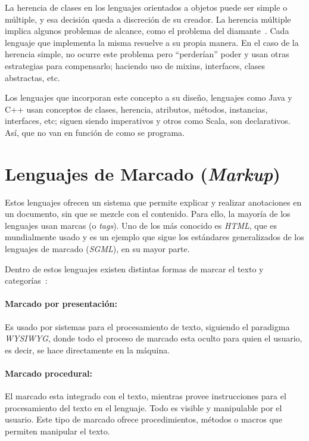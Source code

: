 \documentclass[12pt,letterpaper,titlepage,oneside,openright]{book}
\begin{document}
La herencia de clases en los lenguajes orientados a objetos puede ser simple o múltiple, y esa decisión queda a discreción de su creador. La herencia múltiple implica algunos problemas de alcance, como el problema del diamante~\cite{cargill1993case}. Cada lenguaje que implementa la misma resuelve a su propia manera. En el caso de la herencia simple, no ocurre este problema pero ``perderían'' poder y usan otras estrategias para compensarlo; haciendo uso de mixins, interfaces, clases abstractas, etc.

Los lenguajes que incorporan este concepto a su diseño, lenguajes como Java y C++ usan conceptos de clases, herencia, atributos, métodos, instancias, interfaces, etc; siguen siendo imperativos y otros como Scala, son declarativos. Así, que no van en función de como se programa.

\section{Lenguajes de Marcado (\textit{Markup})}

Estos lenguajes ofrecen un sistema que permite explicar y realizar anotaciones en un documento, sin que se mezcle con el contenido. Para ello, la mayoría de los lenguajes usan marcas (o \textit{tags}). Uno de los más conocido es \textit{HTML}, que es mundialmente usado y es un ejemplo que sigue los estándares generalizados de los lenguajes de marcado (\textit{SGML}), en su mayor parte.

Dentro de estos lenguajes existen distintas formas de marcar el texto y categorías~\cite{coombs1987markup}:

\paragraph{Marcado por presentación:}

Es usado por sistemas para el procesamiento de texto, siguiendo el paradigma \textit{WYSIWYG}, donde todo el proceso de marcado esta oculto para quien el usuario, es decir, se hace directamente en la máquina.

\paragraph{Marcado procedural:}

El marcado esta integrado con el texto, mientras provee instrucciones para el procesamiento del texto en el lenguaje. Todo es visible y manipulable por el usuario. Este tipo de marcado ofrece procedimientos, métodos o macros que permiten manipular el texto.
\end{document}
